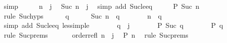 \begin{isabellebody}
\ simp\isanewline
\ \ \isamarkupfalse%
\ \isamarkupfalse%
\ {\isacartoucheopen}n\ {\isacharless}{\kern0pt}\ j{\isacartoucheclose}\ \isamarkupfalse%
\ {\isachardoublequoteopen}Suc\ n\ {\isasymle}\ j{\isachardoublequoteclose}\ \isamarkupfalse%
\ {\isacharparenleft}{\kern0pt}simp\ add{\isacharcolon}{\kern0pt}\ Suc{\isacharunderscore}{\kern0pt}le{\isacharunderscore}{\kern0pt}eq{\isacharparenright}{\kern0pt}\isanewline
\ \ \isamarkupfalse%
\ \isamarkupfalse%
\ {\isachardoublequoteopen}P\ {\isacharparenleft}{\kern0pt}Suc\ n{\isacharparenright}{\kern0pt}{\isachardoublequoteclose}\isanewline
\ \ \isamarkupfalse%
\ {\isacharparenleft}{\kern0pt}rule\ Suc{\isachardot}{\kern0pt}hyps{\isacharparenright}{\kern0pt}\isanewline
\ \ \ \ \isamarkupfalse%
\ q\isanewline
\ \ \ \ \isamarkupfalse%
\ {\isachardoublequoteopen}Suc\ n\ {\isasymle}\ q{\isachardoublequoteclose}\isanewline
\ \ \ \ \isamarkupfalse%
\ \isamarkupfalse%
\ {\isachardoublequoteopen}n\ {\isasymle}\ q{\isachardoublequoteclose}\ \isamarkupfalse%
\ {\isacharparenleft}{\kern0pt}simp\ add{\isacharcolon}{\kern0pt}\ Suc{\isacharunderscore}{\kern0pt}le{\isacharunderscore}{\kern0pt}eq\ less{\isacharunderscore}{\kern0pt}imp{\isacharunderscore}{\kern0pt}le{\isacharparenright}{\kern0pt}\isanewline
\ \ \ \ \isamarkupfalse%
\ \isamarkupfalse%
\ {\isachardoublequoteopen}q\ {\isacharless}{\kern0pt}\ j{\isachardoublequoteclose}\isanewline
\ \ \ \ \isamarkupfalse%
\ \isamarkupfalse%
\ {\isachardoublequoteopen}P\ {\isacharparenleft}{\kern0pt}Suc\ q{\isacharparenright}{\kern0pt}{\isachardoublequoteclose}\isanewline
\ \ \ \ \isamarkupfalse%
\ \isamarkupfalse%
\ {\isachardoublequoteopen}P\ q{\isachardoublequoteclose}\ \isamarkupfalse%
\ {\isacharparenleft}{\kern0pt}rule\ Suc{\isachardot}{\kern0pt}prems{\isacharparenright}{\kern0pt}\isanewline
\ \ \isamarkupfalse%
\isanewline
\ \ \isamarkupfalse%
\ order{\isacharunderscore}{\kern0pt}refl\ {\isacartoucheopen}n\ {\isacharless}{\kern0pt}\ j{\isacartoucheclose}\ \isamarkupfalse%
\ {\isachardoublequoteopen}P\ n{\isachardoublequoteclose}\ \isamarkupfalse%
\ {\isacharparenleft}{\kern0pt}rule\ Suc{\isachardot}{\kern0pt}prems{\isacharparenright}{\kern0pt}\isanewline
{}\isamarkupfalse%

\end{isabellebody}
